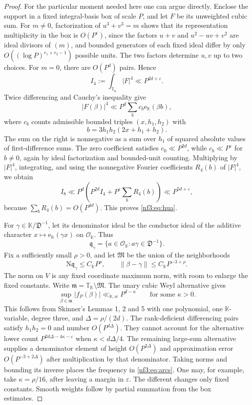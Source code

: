 \documentclass[11pt,letterpaper]{article}
\theoremstyle{definition}
\numberwithin{equation}{section}
\begin{document}
\begin{proof}
For the particular moment needed here one can argue directly. Enclose the support in a fixed integral-basis box of scale $P$, and let $F$ be its unweighted cubic sum. For $m\ne0$, factorization of $u^3+v^3=m$ shows that its representation multiplicity in the box is $O(P^\varepsilon)$, since the factors $u+v$ and $u^2-uv+v^2$ are ideal divisors of $(m)$, and bounded generators of each fixed ideal differ by only $O((\log P)^{r_1+r_2-1})$ possible units. The two factors determine $u,v$ up to two choices. For $m=0$, there are $O(P^d)$ pairs. Hence
\[
 I_4:=\int_{\mathbb T_{\mathbb K}}|F|^4\ll P^{2d+\varepsilon}.
\]
Twice differencing and Cauchy's inequality give
\[
 |F(\beta)|^4\ll P^d\sum_b c_b\mathrm e_{\mathbb K}(\beta b),
\]
where $c_b$ counts admissible bounded triples $(x,h_1,h_2)$ with
\[
 b=3h_1h_2(2x+h_1+h_2).
\]
The sum on the right is nonnegative as a sum over $h_1$ of squared absolute values of first-difference sums. The zero coefficient satisfies $c_0\ll P^{2d}$, while $c_b\ll P^\varepsilon$ for $b\ne0$, again by ideal factorization and bounded-unit counting. Multiplying by $|F|^4$, integrating, and using the nonnegative Fourier coefficients $R_4(b)$ of $|F|^4$, we obtain
\[
 I_8\ll P^d\left(P^{2d}I_4+P^\varepsilon\sum_bR_4(b)\right)
 \ll P^{5d+\varepsilon},
\]
because $\sum_bR_4(b)=O(P^{4d})$. This proves \eqref{nf3:eq:hua}.

For $\gamma\in \mathbb K/\mathfrak D^{-1}$, let its denominator ideal be the conductor ideal of the additive character $x\mapsto\mathrm e_{\mathbb K}(\gamma x)$ on $\mathcal O_{\mathbb K}$. Thus
\[
 \mathfrak q_\gamma=\{a\in\mathcal O_{\mathbb K}:a\gamma\in\mathfrak D^{-1}\}.
\]
Fix a sufficiently small $\rho>0$, and let $\mathfrak M$ be the union of the neighborhoods
\begin{equation}\label{nf3:eq:arcs}
 \mathrm N\mathfrak q_\gamma\le C_{\mathbb K} P^\rho,
 \qquad \|\beta-\gamma\|\le C_{\mathbb K} P^{-3+\rho}.
\end{equation}
The norm on $V$ is any fixed coordinate maximum norm, with room to enlarge the fixed constants. Write $\mathfrak m=\mathbb T_{\mathbb K}\setminus\mathfrak M$. The unary cubic Weyl alternative gives
\begin{equation}\label{nf3:eq:weyl}
 \sup_{\beta\in\mathfrak m}|f_P(\beta)|\ll_{\mathbb K,w}P^{d-\kappa}
 \qquad\text{for some }\kappa>0.
\end{equation}
This follows from Skinner's Lemmas 1, 2 and 5 \cite{nf3:skinner} with one polynomial, one $\mathbb K$-variable, degree three, and $\Delta=\rho/(2d)$. The rank-deficient differencing pairs satisfy $h_1h_2=0$ and number $O(P^{d\Delta})$. They cannot account for the alternative lower count $P^{2d\Delta-4\kappa-\varepsilon}$ when $\kappa<d\Delta/4$. The remaining large-sum alternative supplies a denominator element of height $O(P^{2\Delta})$ and approximation error $O(P^{-3+2\Delta})$ after multiplication by that denominator. Taking norms and bounding its inverse places the frequency in \eqref{nf3:eq:arcs}. One may, for example, take $\kappa=\rho/16$, after leaving a margin in $\varepsilon$. The different changes only fixed constants. Smooth weights follow by partial summation from the box estimates.


\end{proof}
\end{document}
